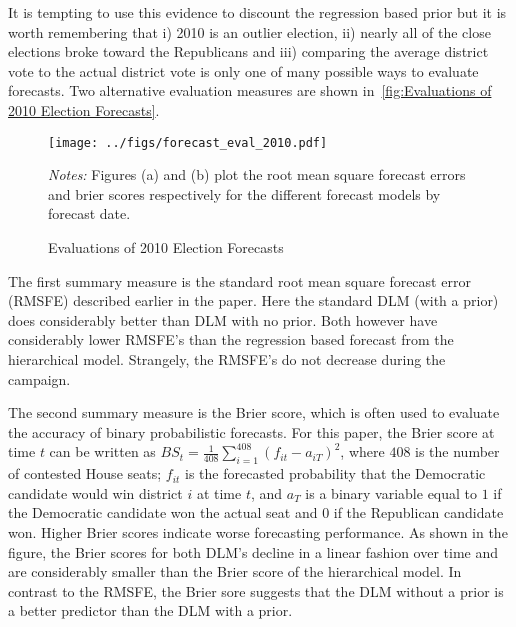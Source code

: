 \documentclass[12pt,final,fleqn]{article}
\theoremstyle{plain}
\begin{document}
It is tempting to use this evidence to discount the regression based prior but it is worth remembering that i) 2010 is an outlier election, ii) nearly all of the close elections broke toward the Republicans and iii) comparing the average district vote to the actual district vote is only one of many possible ways to evaluate forecasts. Two alternative evaluation measures are shown in~\autoref{fig:Evaluations of 2010 Election Forecasts}. 

\begin{figure}[!htb]
\centering
\texttt{[image: ../figs/forecast\_eval\_2010.pdf]}
\vspace{.5cm}
\caption{Evaluations of 2010 Election Forecasts}
\label{fig:Evaluations of 2010 Election Forecasts}
\begin{minipage}{\linewidth}
\footnotesize
\emph{Notes:} Figures (a) and (b) plot the root mean square forecast errors and brier scores respectively for the different forecast models by forecast date. 
\end{minipage}
\end{figure}

The first summary measure is the standard root mean square forecast error (RMSFE) described earlier in the paper. Here the standard DLM (with a prior) does considerably better than DLM with no prior. Both however have considerably lower RMSFE's than the regression based forecast from the hierarchical model. Strangely, the RMSFE's do not decrease during the campaign.

The second summary measure is the Brier score, which is often used to evaluate the accuracy of binary probabilistic forecasts. For this paper, the Brier score at time $t$ can be written as $BS_t = \frac{1}{408} \sum_{i=1}^{408}(f_{it} - a_{iT})^2$, where $408$ is the number of contested House seats; $f_{it}$ is the forecasted probability that the Democratic candidate would win district $i$ at time $t$, and $a_T$ is a binary variable equal to $1$ if the Democratic candidate won the actual seat and $0$ if the Republican candidate won. Higher Brier scores indicate worse forecasting performance. As shown in the figure, the Brier scores for both DLM's decline in a linear fashion over time and are considerably smaller than the Brier score of the hierarchical model. In contrast to the RMSFE, the Brier sore suggests that the DLM without a prior is a better predictor than the DLM with a prior. 
\end{document}
